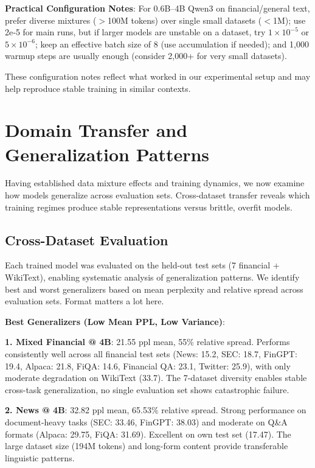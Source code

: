 \textbf{Practical Configuration Notes}: For 0.6B–4B Qwen3 on financial/general text, prefer diverse mixtures ($>$100M tokens) over single small datasets ($<$1M); use 2e‑5 for main runs, but if larger models are unstable on a dataset, try $1\times10^{-5}$ or $5\times10^{-6}$; keep an effective batch size of 8 (use accumulation if needed); and 1,000 warmup steps are usually enough (consider 2,000+ for very small datasets).

These configuration notes reflect what worked in our experimental setup and may help reproduce stable training in similar contexts.

\section{Domain Transfer and Generalization Patterns}

Having established data mixture effects and training dynamics, we now examine how models generalize across evaluation sets. Cross-dataset transfer reveals which training regimes produce stable representations versus brittle, overfit models.

\subsection{Cross-Dataset Evaluation}

Each trained model was evaluated on the held-out test sets (7 financial + WikiText), enabling systematic analysis of generalization patterns. We identify best and worst generalizers based on mean perplexity and relative spread across evaluation sets. Format matters a lot here.

\textbf{Best Generalizers (Low Mean PPL, Low Variance)}:

\textbf{1. Mixed Financial @ 4B}: 21.55 ppl mean, 55\% relative spread. Performs consistently well across all financial test sets (News: 15.2, SEC: 18.7, FinGPT: 19.4, Alpaca: 21.8, FiQA: 14.6, Financial QA: 23.1, Twitter: 25.9), with only moderate degradation on WikiText (33.7). The 7-dataset diversity enables stable cross-task generalization, no single evaluation set shows catastrophic failure.

\textbf{2. News @ 4B}: 32.82 ppl mean, 65.53\% relative spread. Strong performance on document-heavy tasks (SEC: 33.46, FinGPT: 38.03) and moderate on Q\&A formats (Alpaca: 29.75, FiQA: 31.69). Excellent on own test set (17.47). The large dataset size (194M tokens) and long-form content provide transferable linguistic patterns.

